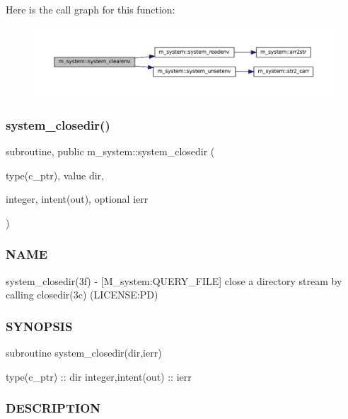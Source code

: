 Here is the call graph for this function\+:\nopagebreak
\begin{figure}[H]
\begin{center}
\leavevmode
\includegraphics[width=350pt]{namespacem__system_a9c34787b170ab8d41000d7c3acb60736_cgraph}
\end{center}
\end{figure}
\mbox{\label{namespacem__system_acd442b52c64fc50482bc08b0ac8a50d1}} 
\subsubsection{\texorpdfstring{system\+\_\+closedir()}{system\_closedir()}}
{\footnotesize\ttfamily subroutine, public m\+\_\+system\+::system\+\_\+closedir (\begin{DoxyParamCaption}\item[{type(c\+\_\+ptr), value}]{dir,  }\item[{integer, intent(out), optional}]{ierr }\end{DoxyParamCaption})}



\subsubsection*{N\+A\+ME}

system\+\_\+closedir(3f) -\/ \mbox{[}M\+\_\+system\+:Q\+U\+E\+R\+Y\+\_\+\+F\+I\+LE\mbox{]} close a directory stream by calling closedir(3c) (L\+I\+C\+E\+N\+SE\+:PD) \subsubsection*{S\+Y\+N\+O\+P\+S\+IS}

subroutine system\+\_\+closedir(dir,ierr)

type(c\+\_\+ptr) \+:\+: dir integer,intent(out) \+:\+: ierr \subsubsection*{D\+E\+S\+C\+R\+I\+P\+T\+I\+ON}

